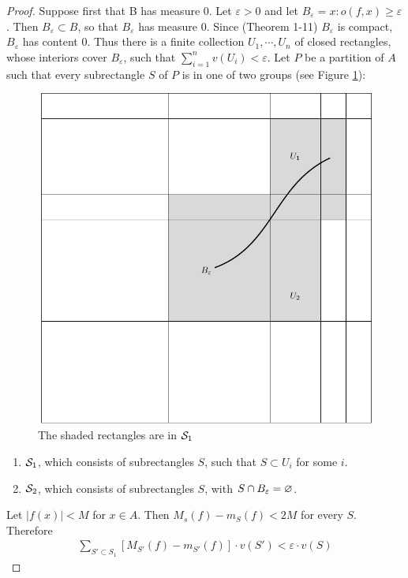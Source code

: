 \begin{proof}
    Suppose first that B has measure 0. Let $\varepsilon > 0$ and
    let $B_\varepsilon = {x: o(f,x) \ge \varepsilon}$. Then $B_\varepsilon \subset B$, 
    so that $B_\varepsilon$ has measure 0. Since (Theorem 1-11) $B_\varepsilon$ is compact, 
    $B_\varepsilon$ has content 0. Thus there is a finite collection $U_1, \cdots, U_n$ of
    closed rectangles, whose interiors cover $B_\varepsilon$, such that $\sum_{i=1}^{n }{v(U_i)}
    <\varepsilon$. Let $P$ be a partition of $A$ such that every subrectangle $S$ of 
    $P$ is in one of two groups (see Figure \ref{Fig 3-1}):
    \begin{figure}[htb]
        \centering
        \includegraphics[width=.75\linewidth]{./pics/Fig3-1.pdf}
        \caption{The shaded rectangles are in $\mathcal{S}_1$}
        \label{Fig 3-1}
    \end{figure}

    \begin{enumerate}[label={\upshape(\arabic*)}]
        \item $\mathcal{S}_1$, which consists of subrectangles $S$, such that $S\subset U_i$ for some $i$.
        \item $\mathcal{S}_2$, which consists of subrectangles $S$, with $S\cap B_\varepsilon=\varnothing$. 
    \end{enumerate}
    Let $|f(x)|<M$ for $x\in A$. Then $M_s(f)-m_S(f)<2M$ for every $S$. Therefore 
    \begin{align*}
        \sum_{S'\subset S_1}^{}{[M_{S'}(f) - m_{S'}(f)]\cdot v(S')} < \varepsilon\cdot v(S)
    \end{align*}


\end{proof}
